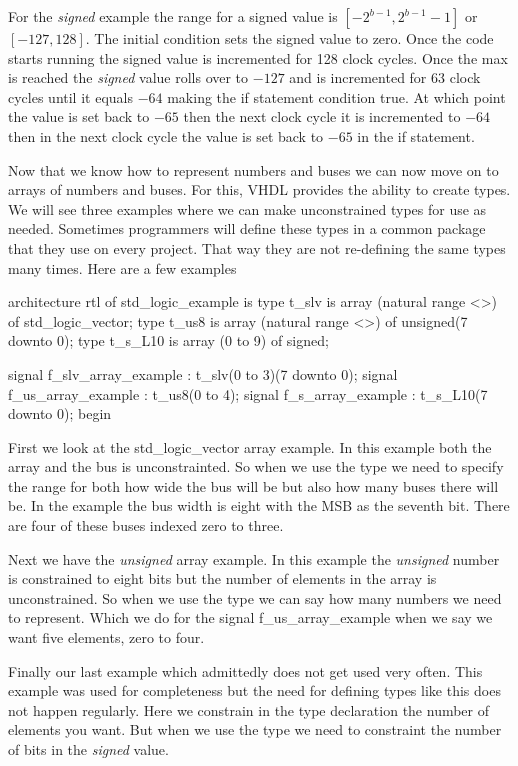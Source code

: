 For the \emph{signed} example the range for a signed value is $[-2^{b-1},2^{b-1}-1]$ or $[-127,128]$. The initial condition sets the signed value to zero. Once the code starts running the signed value is incremented for 128 clock cycles. Once the max is reached the \emph{signed} value rolls over to $-127$ and is incremented for $63$ clock cycles until it equals $-64$ making the if statement condition true. At which point the value is set back to $-65$ then the next clock cycle it is incremented to $-64$ then in the next clock cycle the value is set back to $-65$ in the if statement. 

Now that we know how to represent numbers and buses we can now move on to arrays of numbers and buses. For this, \ac{VHDL} provides the ability to create types. We will see three examples where we can make unconstrained types for use as needed. Sometimes programmers will define these types in a common package that they use on every project. That way they are not re-defining the same types many times. Here are a few examples

\begin{VHDLlisting}[tabsize=4]
architecture rtl of std_logic_example is
   type t_slv is array (natural range <>) of std_logic_vector;
   type t_us8 is array (natural range <>) of unsigned(7 downto 0);
   type t_s_L10 is array (0 to 9) of signed;
   
   signal f_slv_array_example : t_slv(0 to 3)(7 downto 0);
   signal f_us_array_example  : t_us8(0 to 4);
   signal f_s_array_example   : t_s_L10(7 downto 0);
begin
\end{VHDLlisting}

First we look at the std\_logic\_vector array example. In this example both the array and the bus is unconstrainted. So when we use the type we need to specify the range for both how wide the bus will be but also how many buses there will be. In the example the bus width is eight with the \ac{MSB} as the seventh bit. There are four of these buses indexed zero to three. 

Next we have the \emph{unsigned} array example. In this example the \emph{unsigned} number is constrained to eight bits but the number of elements in the array is unconstrained. So when we use the type we can say how many numbers we need to represent. Which we do for the signal f\_us\_array\_example when we say we want five elements, zero to four. 

Finally our last example which admittedly does not get used very often. This example was used for completeness but the need for defining types like this does not happen regularly. Here we constrain in the type declaration the number of elements you want. But when we use the type we need to constraint the number of bits in the \emph{signed} value. 

